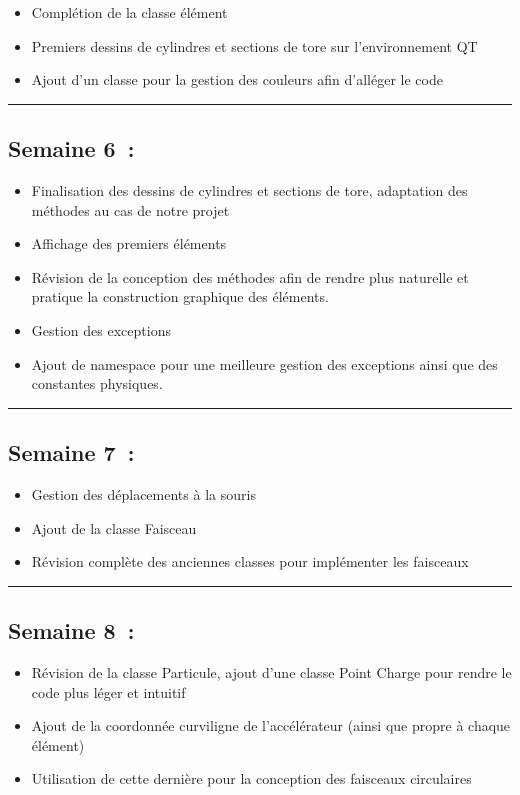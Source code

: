 \documentclass[12pt, letterpaper, twoside]{article}
\begin{document}
\begin{itemize}
\item Complétion de la classe élément
\item Premiers dessins de cylindres et sections de tore sur l'environnement QT
\item Ajout d'un classe pour la gestion des couleurs afin d'alléger le code
\end{itemize}

\rule{\textwidth}{0.4pt}

\subsection{Semaine 6 :}
\begin{itemize}
\item Finalisation des dessins de cylindres et sections de tore, adaptation des méthodes au cas de notre projet
\item Affichage des premiers éléments
\item Révision de la conception des méthodes afin de rendre plus naturelle et pratique la construction graphique des éléments.
\item Gestion des exceptions
\item Ajout de namespace pour une meilleure gestion des exceptions ainsi que des constantes physiques.
\end{itemize}

\rule{\textwidth}{0.4pt}

\subsection{Semaine 7 :}
\begin{itemize}
\item Gestion des déplacements à la souris
\item Ajout de la classe Faisceau
\item Révision complète des anciennes classes pour implémenter les faisceaux 
\end{itemize}

\rule{\textwidth}{0.4pt}

\subsection{Semaine 8 :}
\begin{itemize}
\item Révision de la classe Particule, ajout d'une classe Point Charge pour rendre le code plus léger et intuitif
\item Ajout de la coordonnée curviligne de l'accélérateur (ainsi que propre à chaque élément)
\item Utilisation de cette dernière pour la conception des faisceaux circulaires
\end{itemize}
\end{document}
